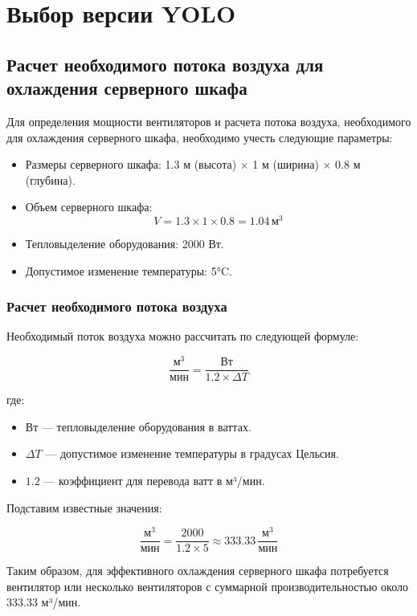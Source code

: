 \chapter {Выбор версии YOLO}

\section{Расчет необходимого потока воздуха для охлаждения серверного шкафа}

Для определения мощности вентиляторов и расчета потока воздуха, необходимого для охлаждения серверного шкафа, необходимо учесть следующие параметры:

\begin{itemize}
    \item Размеры серверного шкафа: 1.3 м (высота) $\times$ 1 м (ширина) $\times$ 0.8 м (глубина).
    \item Объем серверного шкафа: 
    \[
    V = 1.3 \times 1 \times 0.8 = 1.04 \, \text{м}^3
    \]
    \item Тепловыделение оборудования: 2000 Вт.
    \item Допустимое изменение температуры: 5°C.
\end{itemize}

\subsection{Расчет необходимого потока воздуха}

Необходимый поток воздуха можно рассчитать по следующей формуле:

\[
\frac{\text{м}^3}{\text{мин}} = \frac{\text{Вт}}{1.2 \times \Delta T}
\]

где:
\begin{itemize}
    \item Вт — тепловыделение оборудования в ваттах.
    \item $\Delta T$ — допустимое изменение температуры в градусах Цельсия.
    \item $1.2$ — коэффициент для перевода ватт в м³/мин.
\end{itemize}

Подставим известные значения:

\[
\frac{\text{м}^3}{\text{мин}} = \frac{2000}{1.2 \times 5} \approx 333.33 \, \frac{\text{м}^3}{\text{мин}}
\]

Таким образом, для эффективного охлаждения серверного шкафа потребуется вентилятор или несколько вентиляторов с суммарной производительностью около 333.33 м³/мин.

